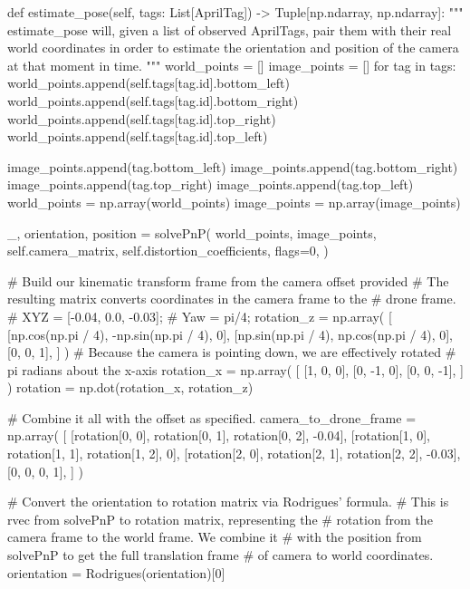 \documentclass{article}
\begin{document}
\begin{python}
    def estimate_pose(self, tags: List[AprilTag]) -> Tuple[np.ndarray, np.ndarray]:
    """
    estimate_pose will, given a list of observed AprilTags,
    pair them with their real world coordinates in order to
    estimate the orientation and position of the camera at
    that moment in time.
    """
    world_points = []
    image_points = []
    for tag in tags:
    world_points.append(self.tags[tag.id].bottom_left)
    world_points.append(self.tags[tag.id].bottom_right)
    world_points.append(self.tags[tag.id].top_right)
    world_points.append(self.tags[tag.id].top_left)

    image_points.append(tag.bottom_left)
    image_points.append(tag.bottom_right)
    image_points.append(tag.top_right)
    image_points.append(tag.top_left)
    world_points = np.array(world_points)
    image_points = np.array(image_points)

    _, orientation, position = solvePnP(
    world_points,
    image_points,
    self.camera_matrix,
    self.distortion_coefficients,
    flags=0,
    )

    # Build our kinematic transform frame from the camera offset provided
    # The resulting matrix converts coordinates in the camera frame to the
    # drone frame.
    # XYZ = [-0.04, 0.0, -0.03];
    # Yaw = pi/4;
    rotation_z = np.array(
    [
            [np.cos(np.pi / 4), -np.sin(np.pi / 4), 0],
            [np.sin(np.pi / 4), np.cos(np.pi / 4), 0],
            [0, 0, 1],
        ]
    )
    # Because the camera is pointing down, we are effectively rotated
    # pi radians about the x-axis
    rotation_x = np.array(
    [
            [1, 0, 0],
            [0, -1, 0],
            [0, 0, -1],
        ]
    )
    rotation = np.dot(rotation_x, rotation_z)

    # Combine it all with the offset as specified.
    camera_to_drone_frame = np.array(
    [
            [rotation[0, 0], rotation[0, 1], rotation[0, 2], -0.04],
            [rotation[1, 0], rotation[1, 1], rotation[1, 2], 0],
            [rotation[2, 0], rotation[2, 1], rotation[2, 2], -0.03],
            [0, 0, 0, 1],
        ]
    )

    # Convert the orientation to rotation matrix via Rodrigues' formula.
    # This is rvec from solvePnP to rotation matrix, representing the
    # rotation from the camera frame to the world frame. We combine it
    # with the position from solvePnP to get the full translation frame
    # of camera to world coordinates.
    orientation = Rodrigues(orientation)[0]


\end{python}
\end{document}
